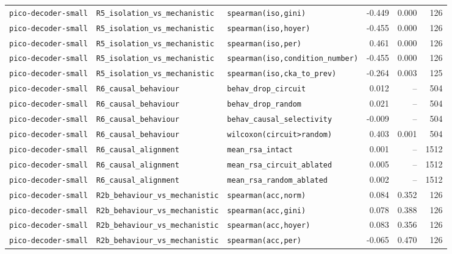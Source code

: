 \begin{longtable}{lllrrr}
\texttt{pico-decoder-small} & \texttt{R5\_isolation\_vs\_mechanistic} & \texttt{spearman(iso,gini)} & -0.449 & 0.000 & 126 \\
\texttt{pico-decoder-small} & \texttt{R5\_isolation\_vs\_mechanistic} & \texttt{spearman(iso,hoyer)} & -0.455 & 0.000 & 126 \\
\texttt{pico-decoder-small} & \texttt{R5\_isolation\_vs\_mechanistic} & \texttt{spearman(iso,per)} & 0.461 & 0.000 & 126 \\
\texttt{pico-decoder-small} & \texttt{R5\_isolation\_vs\_mechanistic} & \texttt{spearman(iso,condition\_number)} & -0.455 & 0.000 & 126 \\
\texttt{pico-decoder-small} & \texttt{R5\_isolation\_vs\_mechanistic} & \texttt{spearman(iso,cka\_to\_prev)} & -0.264 & 0.003 & 125 \\
\texttt{pico-decoder-small} & \texttt{R6\_causal\_behaviour} & \texttt{behav\_drop\_circuit} & 0.012 & -- & 504 \\
\texttt{pico-decoder-small} & \texttt{R6\_causal\_behaviour} & \texttt{behav\_drop\_random} & 0.021 & -- & 504 \\
\texttt{pico-decoder-small} & \texttt{R6\_causal\_behaviour} & \texttt{behav\_causal\_selectivity} & -0.009 & -- & 504 \\
\texttt{pico-decoder-small} & \texttt{R6\_causal\_behaviour} & \texttt{wilcoxon(circuit>random)} & 0.403 & 0.001 & 504 \\
\texttt{pico-decoder-small} & \texttt{R6\_causal\_alignment} & \texttt{mean\_rsa\_intact} & 0.001 & -- & 1512 \\
\texttt{pico-decoder-small} & \texttt{R6\_causal\_alignment} & \texttt{mean\_rsa\_circuit\_ablated} & 0.005 & -- & 1512 \\
\texttt{pico-decoder-small} & \texttt{R6\_causal\_alignment} & \texttt{mean\_rsa\_random\_ablated} & 0.002 & -- & 1512 \\
\texttt{pico-decoder-small} & \texttt{R2b\_behaviour\_vs\_mechanistic} & \texttt{spearman(acc,norm)} & 0.084 & 0.352 & 126 \\
\texttt{pico-decoder-small} & \texttt{R2b\_behaviour\_vs\_mechanistic} & \texttt{spearman(acc,gini)} & 0.078 & 0.388 & 126 \\
\texttt{pico-decoder-small} & \texttt{R2b\_behaviour\_vs\_mechanistic} & \texttt{spearman(acc,hoyer)} & 0.083 & 0.356 & 126 \\
\texttt{pico-decoder-small} & \texttt{R2b\_behaviour\_vs\_mechanistic} & \texttt{spearman(acc,per)} & -0.065 & 0.470 & 126 \\

\end{longtable}
